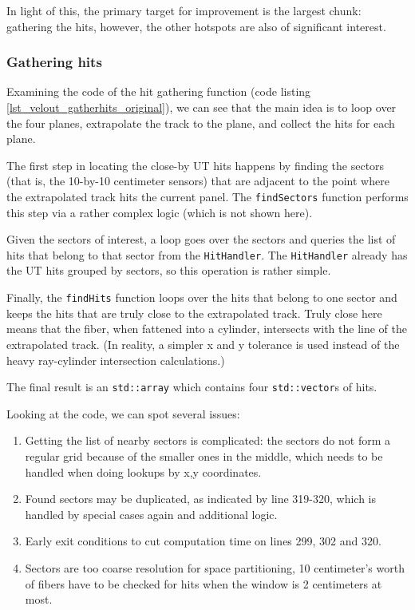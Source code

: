 \documentclass[12pt]{article}
\newcommand{\code}[1]{\texttt{#1}}
\begin{document}
In light of this, the primary target for improvement is the largest chunk: gathering the hits, however, the other hotspots are also of significant interest.


\subsubsection{Gathering hits}

Examining the code of the hit gathering function (code listing \ref{lst_velout_gatherhits_original}), we can see that the main idea is to loop over the four planes, extrapolate the track to the plane, and collect the hits for each plane.

The first step in locating the close-by UT hits happens by finding the sectors (that is, the 10-by-10 centimeter sensors) that are adjacent to the point where the extrapolated track hits the current panel. The \code{findSectors} function performs this step via a rather complex logic (which is not shown here).

Given the sectors of interest, a loop goes over the sectors and queries the list of hits that belong to that sector from the \code{HitHandler}. The \code{HitHandler} already has the UT hits grouped by sectors, so this operation is rather simple.

Finally, the \code{findHits} function loops over the hits that belong to one sector and keeps the hits that are truly close to the extrapolated track. Truly close here means that the fiber, when fattened into a cylinder, intersects with the line of the extrapolated track. (In reality, a simpler x and y tolerance is used instead of the heavy ray-cylinder intersection calculations.)

The final result is an \code{std::array} which contains four \code{std::vector}s of hits.

\vspace{1pc}

Looking at the code, we can spot several issues:
\begin{enumerate}
	\item Getting the list of nearby sectors is complicated: the sectors do not form a regular grid because of the smaller ones in the middle, which needs to be handled when doing lookups by x,y coordinates.
	\item Found sectors may be duplicated, as indicated by line 319-320, which is handled by special cases again and additional logic.
	\item Early exit conditions to cut computation time on lines 299, 302 and 320.
	\item Sectors are too coarse resolution for space partitioning, 10 centimeter's worth of fibers have to be checked for hits when the window is 2 centimeters at most.
\end{enumerate}
\end{document}
